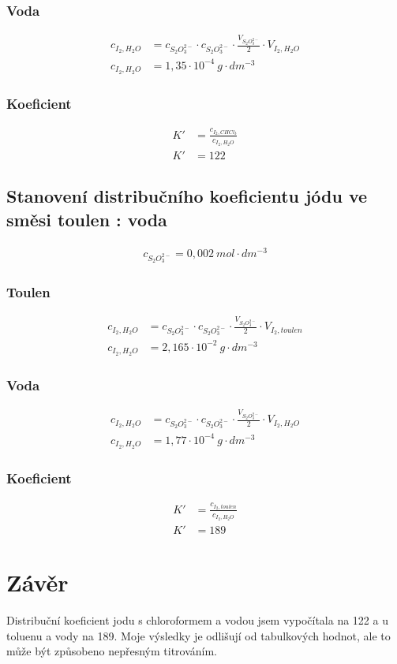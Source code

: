 \documentclass[13pt, a4paper, twoside]{article}
\begin{document}
\subsubsection*{Voda}
\begin{align*}
    c_{I_2, H_2O} &= c_{S_2O_3^{2-}} \cdot c_{S_2O_3^{2-}} \cdot \frac{V_{S_2O_3^{2-}}}{2} \cdot V_{I_2, H_2O}\\
    c_{I_2, H_2O} &= 1,35 \cdot 10^{-4} \: g\cdot dm^{-3}
\end{align*}

\subsubsection*{Koeficient}
\begin{align*}
    K' &= \frac{c_{I_2, CHCl_3}}{c_{I_2, H_2O}}\\
    K' &= 122
\end{align*}

\subsection*{Stanovení distribučního koeficientu jódu ve směsi toulen : voda}
\begin{align*}
    c_{S_2O_3^{2-}} = 0,002\: mol \cdot dm^{-3}
\end{align*}
\subsubsection*{Toulen}
\begin{align*}
    c_{I_2, H_2O} &= c_{S_2O_3^{2-}} \cdot c_{S_2O_3^{2-}} \cdot \frac{V_{S_2O_3^{2-}}}{2} \cdot V_{I_2, toulen}\\
    c_{I_2, H_2O} &= 2,165 \cdot 10^{-2} \: g\cdot dm^{-3}
\end{align*}

\subsubsection*{Voda}
\begin{align*}
    c_{I_2, H_2O} &= c_{S_2O_3^{2-}} \cdot c_{S_2O_3^{2-}} \cdot \frac{V_{S_2O_3^{2-}}}{2} \cdot V_{I_2, H_2O}\\
    c_{I_2, H_2O} &= 1,77 \cdot 10^{-4} \: g\cdot dm^{-3}
\end{align*}

\subsubsection*{Koeficient}
\begin{align*}
    K' &= \frac{c_{I_2, toulen}}{c_{I_2, H_2O}}\\
    K' &= 189
\end{align*}

\section*{Závěr}
Distribuční koeficient jodu s chloroformem a vodou jsem vypočítala na 122 a u toluenu a vody na 189. Moje výsledky je odlišují od tabulkových hodnot, ale to může být způsobeno nepřesným titrováním.
\end{document}
